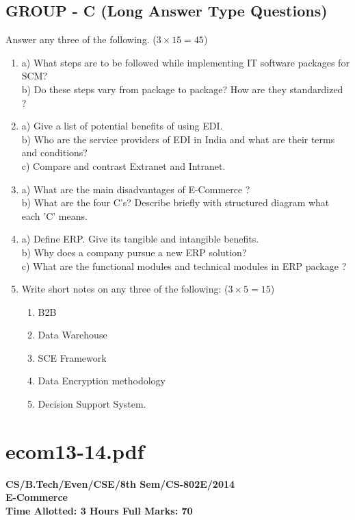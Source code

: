 \documentclass{article}
\begin{document}
\subsection*{GROUP - C (Long Answer Type Questions)}
Answer any three of the following. ($3 \times 15 = 45$)
\begin{enumerate}
    \item[7.] 
    a) What steps are to be followed while implementing IT software packages for SCM? \\
    b) Do these steps vary from package to package? How are they standardized ?
    \item[8.] 
    a) Give a list of potential benefits of using EDI. \\
    b) Who are the service providers of EDI in India and what are their terms and conditions? \\
    c) Compare and contrast Extranet and Intranet.
    \item[9.] 
    a) What are the main disadvantages of E-Commerce ? \\
    b) What are the four C's? Describe briefly with structured diagram what each 'C' means.
    \item[10.] 
    a) Define ERP. Give its tangible and intangible benefits. \\
    b) Why does a company pursue a new ERP solution? \\
    c) What are the functional modules and technical modules in ERP package ?
    \item[11.] Write short notes on any three of the following: ($3 \times 5 = 15$)
    \begin{enumerate}
        \item[a)] B2B
        \item[b)] Data Warehouse
        \item[c)] SCE Framework
        \item[d)] Data Encryption methodology
        \item[e)] Decision Support System.
    \end{enumerate}
\end{enumerate}

\newpage
\section*{ecom13-14.pdf}
\textbf{CS/B.Tech/Even/CSE/8th Sem/CS-802E/2014} \\
\textbf{E-Commerce} \\
\textbf{Time Allotted: 3 Hours \hfill Full Marks: 70}
\end{document}
